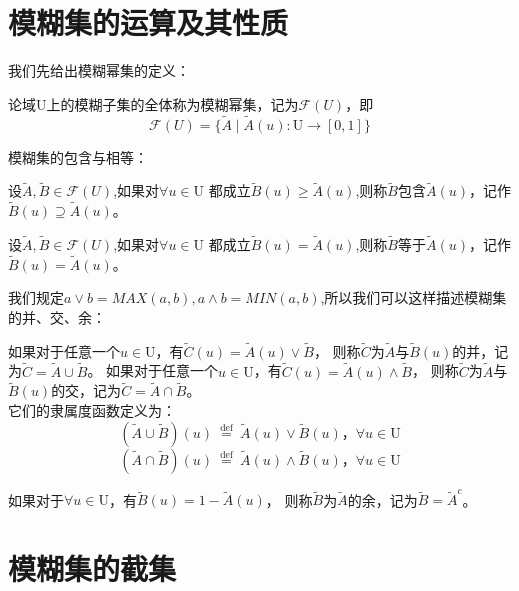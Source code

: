 \section{模糊集的运算及其性质}
我们先给出模糊幂集的定义：
\begin{definition}
    论域$\mathrm{U}$上的模糊子集的全体称为模糊幂集，记为$\mathscr{F}(U)$，即
    \[
        \mathscr{F}(U)=\{\tilde{A} \mid \tilde{A}(u):\mathrm{U} \to [0,1]\}
    \]
\end{definition}
模糊集的包含与相等：
\begin{definition}
    设$\tilde{A}, \tilde{B} \in \mathscr{F}(U)$,如果对$\forall u \in \mathrm{U}$
    都成立$\tilde{B}(u)\geqslant \tilde{A}(u)$,则称$\tilde{B}$包含$\tilde{A}(u)$，记作$\tilde{B}(u )\supseteq \tilde{A}(u)$。
\end{definition}
\begin{definition}
    设$\tilde{A}, \tilde{B} \in \mathscr{F}(U)$,如果对$\forall u \in \mathrm{U}$
    都成立$\tilde{B}(u) = \tilde{A}(u)$,则称$\tilde{B}$等于$\tilde{A}(u)$，记作$\tilde{B}(u)= \tilde{A}(u)$。
\end{definition}
我们规定$a\vee b=MAX(a,b),a\wedge b=MIN(a,b)$,所以我们可以这样描述模糊集的并、交、余：

\begin{definition}
    如果对于任意一个$u \in \mathrm{U}$，有$\tilde{C}(u)=\tilde{A}(u) \vee \tilde{B}$，
    则称$\tilde{C}$为$\tilde{A}$与$\tilde{B}(u)$的并，记为$\tilde{C}=\tilde{A} \cup \tilde{B}$。
    如果对于任意一个$u \in \mathrm{U}$，有$\tilde{C}(u)=\tilde{A}(u) \wedge \tilde{B}$，
    则称$\tilde{C}$为$\tilde{A}$与$\tilde{B}(u)$的交，记为$\tilde{C}=\tilde{A} \cap \tilde{B}$。\\
    它们的隶属度函数定义为：
    \[
        (\tilde{A}\cup  \tilde{B})(u) \stackrel{\text { def }}{=}\tilde{A}(u) \vee \tilde{B}(u) ， \forall u \in \mathrm{U}
    \]
    \[
        (\tilde{A}\cap   \tilde{B})(u) \stackrel{\text { def }}{=}\tilde{A}(u) \wedge \tilde{B}(u) ，\forall u \in \mathrm{U}
    \]
\end{definition}
\begin{definition}
    如果对于$\forall u \in \mathrm{U}$，有$\tilde{B}(u)=1-\tilde{A}(u) $，
    则称$\tilde{B}$为$\tilde{A}$的余，记为$\tilde{B}=\tilde{A}^c$。
\end{definition}
\section{模糊集的截集}
